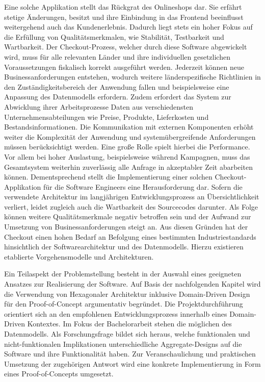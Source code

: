 Eine solche Applikation stellt das Rückgrat des Onlineshops dar. Sie erfährt stetige Änderungen, besitzt  und ihre Einbindung in das Frontend beeinflusst weitergehend auch das Kundenerlebnis. Dadurch liegt stets ein hoher Fokus auf die Erfüllung von Qualitätsmerkmalen, wie Stabilität, Testbarkeit und Wartbarkeit. Der Checkout-Prozess, welcher durch diese Software abgewickelt wird, muss für alle relevanten Länder und ihre individuellen gesetzlichen Voraussetzungen fiskalisch korrekt ausgeführt werden. Jederzeit können neue Businessanforderungen entstehen, wodurch weitere länderspezifische Richtlinien in den Zuständigkeitsbereich der Anwendung fallen und beispielsweise eine Anpassung des Datenmodells erfordern. Zudem erfordert das System zur Abwicklung ihrer Arbeitsprozesse Daten aus verschiedensten Unternehmensabteilungen wie Preise, Produkte, Lieferkosten und Bestandsinformationen. Die Kommunikation mit externen Komponenten erhöht weiter die Komplexität der Anwendung und systemübergreifende Anforderungen müssen berücksichtigt werden. Eine große Rolle spielt hierbei die Performance. Vor allem bei hoher Auslastung, beispielsweise während Kampagnen, muss das Gesamtsystem weiterhin zuverlässig alle Anfrage in akzeptabler Zeit abarbeiten können. Dementsprechend stellt die Implementierung einer solchen Checkout-Applikation für die Software Engineers eine Herausforderung dar. Sofern die verwendete Architektur im langjährigen Entwicklungsprozess an Übersichtlichkeit verliert, leidet zugleich auch die Wartbarkeit des Sourcecodes darunter. Als Folge können weitere Qualitätsmerkmale negativ betroffen sein und der Aufwand zur Umsetzung von Businessanforderungen steigt an. Aus diesen Gründen hat der Checkout einen hohen Bedarf an Befolgung eines bestimmten Industriestandards hinsichtlich der Softwarearchitektur und des Datenmodells. Hierzu existieren etablierte Vorgehensmodelle und Architekturen. 

Ein Teilaspekt der Problemstellung besteht in der Auswahl eines geeigneten Ansatzes zur Realisierung der Software. Auf Basis der nachfolgenden Kapitel wird die Verwendung von Hexagonaler Architektur inklusive Domain-Driven Design für den Proof-of-Concept argumentativ begründet. Die Projektdurchführung orientiert sich an den empfohlenen Entwicklungsprozess innerhalb eines Domain-Driven Kontextes. Im Fokus der Bachelorarbeit stehen die möglichen  des Datenmodells. Als Forschungsfrage bildet sich heraus, welche funktionalen und nicht-funktionalen Implikationen unterschiedliche Aggregate-Designs auf die Software und ihre Funktionalität haben. Zur Veranschaulichung und praktischen Umsetzung der zugehörigen Antwort wird eine konkrete Implementierung in Form eines Proof-of-Concepts umgesetzt.

